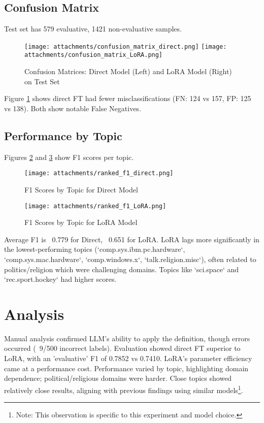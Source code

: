 \documentclass{article}
\begin{document}
\subsection{Confusion Matrix}
\label{sec:results:confusion_matrix}
Test set has 579 evaluative, 1421 non-evaluative samples.

\begin{figure}[h!]
    \centering
    \texttt{[image: attachments/confusion\_matrix\_direct.png]} %
    \texttt{[image: attachments/confusion\_matrix\_LoRA.png]} %
    \caption{Confusion Matrices: Direct Model (Left) and LoRA Model (Right) on Test Set}
    \label{fig:confusion_matrices} %
\end{figure}
Figure \ref{fig:confusion_matrices} shows direct FT had fewer misclassifications (FN: 124 vs 157, FP: 125 vs 138). Both show notable False Negatives.

\subsection{Performance by Topic}
\label{sec:results:topic}
Figures \ref{fig:ranked_f1_direct} and \ref{fig:ranked_f1_LoRA} show F1 scores per topic.

\begin{figure}[h!]
    \centering
    \texttt{[image: attachments/ranked\_f1\_direct.png]} %
    \caption{F1 Scores by Topic for Direct Model}
    \label{fig:ranked_f1_direct}
\end{figure}

\begin{figure}[h!]
    \centering
    \texttt{[image: attachments/ranked\_f1\_LoRA.png]} %
    \caption{F1 Scores by Topic for LoRA Model}
    \label{fig:ranked_f1_LoRA}
\end{figure}
Average F1 is ~0.779 for Direct, ~0.651 for LoRA. LoRA lags more significantly in the lowest-performing topics (`comp.sys.ibm.pc.hardware`, `comp.sys.mac.hardware`, `comp.windows.x`, `talk.religion.misc`), often related to politics/religion which were challenging domains. Topics like `sci.space` and `rec.sport.hockey` had higher scores.

\section{Analysis}
\label{sec:analysis}
Manual analysis confirmed LLM's ability to apply the definition, though errors occurred (~9/500 incorrect labels). Evaluation showed direct FT superior to LoRA, with an 'evaluative' F1 of 0.7852 vs 0.7410. LoRA's parameter efficiency came at a performance cost. Performance varied by topic, highlighting domain dependence; political/religious domains were harder. Close topics showed relatively close results, aligning with previous findings using similar models\footnote{Note: This observation is specific to this experiment and model choice.}.
\end{document}
